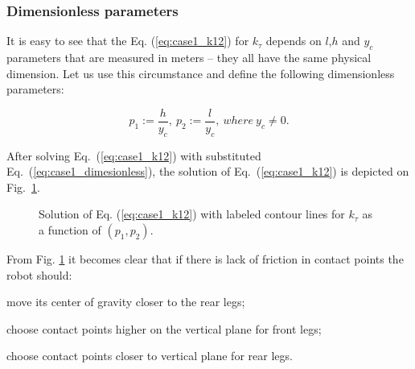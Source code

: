 \documentclass{ws-procs9x6}
\begin{document}
%
%

\subsubsection{Dimensionless parameters}

It is easy to see that the Eq. (\ref{eq:case1_k12}) for $k_\tau$ depends on $l$,$h$ and $y_c$ parameters that are measured in meters – they all have the same physical dimension. Let us use this circumstance and define the following dimensionless parameters:

\begin{equation}
\label{eq:case1_dimesionless}
p_1 := \dfrac{h}{y_c},~p_2 := \dfrac{l}{y_c},~where ~y_c \ne 0.
\end{equation}

After solving Eq.~(\ref{eq:case1_k12}) with substituted Eq.~(\ref{eq:case1_dimesionless}), the solution of Eq.~(\ref{eq:case1_k12}) is depicted on Fig.~\ref{aba:case1_dimless_figure}.


\begin{figure}
  \begin{center}
  \end{center}
  \caption{Solution of Eq. (\ref{eq:case1_k12}) with labeled contour lines for $k_\tau$ as a function of $(p_1, p_2)$.}
  \label{aba:case1_dimless_figure}
\end{figure}

From Fig. \ref{aba:case1_dimless_figure} it becomes clear that if there is lack of friction in contact points the robot should:
\begin{itemlist}
\item move its center of gravity closer to the rear legs;
\item choose contact points higher on the vertical plane for front legs;
\item choose contact points closer to vertical plane for rear legs.
\end{itemlist}
\end{document}
